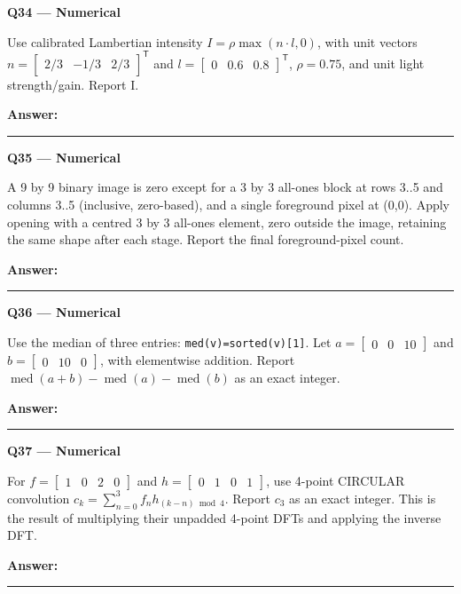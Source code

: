 \documentclass[11pt,a4paper]{article}
\begin{document}
\par\vspace{12pt}
\begin{minipage}{\linewidth}
\textbf{Q34 — Numerical}\par\smallskip
Use calibrated Lambertian intensity \(I=\rho\max(n\cdot l,0)\),\allowbreak{} with unit vectors \(n=\begin{bmatrix}2/3&-1/3&2/3\end{bmatrix}^{\mathsf T}\) and \(l=\begin{bmatrix}0&0.6&0.8\end{bmatrix}^{\mathsf T}\),\allowbreak{} \(\rho=0.75\),\allowbreak{} and unit light strength/\allowbreak{}gain. Report I.
\par\medskip\textbf{Answer:} \rule{55mm}{0.4pt}
\end{minipage}
\par\vspace{12pt}
\begin{minipage}{\linewidth}
\textbf{Q35 — Numerical}\par\smallskip
A 9 by 9 binary image is zero except for a 3 by 3 all-ones block at rows 3..5 and columns 3..5 (inclusive,\allowbreak{} zero-based),\allowbreak{} and a single foreground pixel at (0,\allowbreak{}0). Apply opening with a centred 3 by 3 all-ones element,\allowbreak{} zero outside the image,\allowbreak{} retaining the same shape after each stage. Report the final foreground-pixel count.
\par\medskip\textbf{Answer:} \rule{55mm}{0.4pt}
\end{minipage}
\par\vspace{12pt}
\begin{minipage}{\linewidth}
\textbf{Q36 — Numerical}\par\smallskip
Use the median of three entries: \texttt{med(v)=\allowbreak{}sorted(v)[1]}. Let \(a=\begin{bmatrix}0&0&10\end{bmatrix}\) and \(b=\begin{bmatrix}0&10&0\end{bmatrix}\),\allowbreak{} with elementwise addition. Report \(\operatorname{med}(a+b)-\operatorname{med}(a)-\operatorname{med}(b)\) as an exact integer.
\par\medskip\textbf{Answer:} \rule{55mm}{0.4pt}
\end{minipage}
\par\vspace{12pt}
\begin{minipage}{\linewidth}
\textbf{Q37 — Numerical}\par\smallskip
For \(f=\begin{bmatrix}1&0&2&0\end{bmatrix}\) and \(h=\begin{bmatrix}0&1&0&1\end{bmatrix}\),\allowbreak{} use 4-point CIRCULAR convolution \(c_k=\sum_{n=0}^{3}f_n h_{(k-n)\bmod4}\). Report \(c_3\) as an exact integer. This is the result of multiplying their unpadded 4-point DFTs and applying the inverse DFT.
\par\medskip\textbf{Answer:} \rule{55mm}{0.4pt}
\end{minipage}
\end{document}

